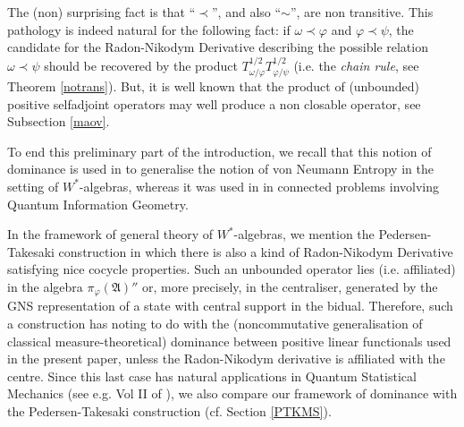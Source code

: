 \documentclass[12pt]{amsart}
\numberwithin{equation}{section}
\def\ga{{\mathfrak A}} \def\gpa{{\mathfrak a}}
\def\f{\varphi}\def\ff{\phi} \def\F{\Phi}
\def\om{\omega} \def\Om{\Omega}
\begin{document}
The (non) surprising fact is that ``$\prec$'', and also ``$\sim$'', are non transitive. This pathology is indeed natural for the following fact: if $\om\prec\f$ and $\f\prec\psi$, the candidate for the  Radon-Nikodym Derivative describing the possible relation 
$\om\prec\psi$ should be recovered by the product $T^{1/2}_{\om/\f}T^{1/2}_{\f/\psi}$ (i.e. the {\it chain rule}, see Theorem \ref{notrans}).
But, it is well known that the product of (unbounded) positive selfadjoint operators may well produce a non closable operator, see Subsection \ref{maov}.

To end this preliminary part of the introduction, we recall that this notion of dominance is used in \cite{N} to generalise the notion of von Neumann Entropy in the setting of $W^*$-algebras, whereas it was used in \cite{Hi} in connected problems involving Quantum Information Geometry.

In the framework of general theory of $W^*$-algebras, we mention the Pedersen-Takesaki construction in which there is also a kind of Radon-Nikodym Derivative satisfying nice cocycle properties. Such an unbounded operator lies (i.e. affiliated)
in the algebra $\pi_\f(\ga)''$ or, more precisely, in the centraliser, generated by the GNS representation of a state with central support in the bidual. Therefore, such a construction has noting to do with the (noncommutative generalisation of classical 
measure-theoretical) dominance between positive linear functionals used in the present paper, unless the Radon-Nikodym derivative is affiliated with the centre. Since this last case has natural applications in Quantum Statistical Mechanics (see e.g. Vol II of \cite{BR}), we also compare our framework of dominance with the Pedersen-Takesaki construction (cf. Section \ref{PTKMS}).
\end{document}
